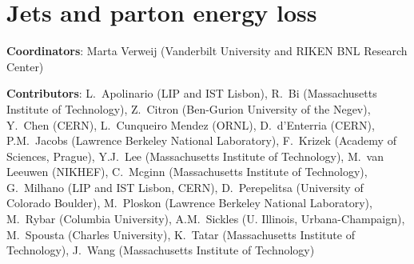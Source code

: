 \documentclass[../report.tex]{subfiles}
\providecommand{\main}{..}
\begin{document}
\section{Jets and parton energy loss}\label{sec:HI_Jets}

{ \small
  \noindent \textbf{Coordinators}: Marta Verweij (Vanderbilt University and RIKEN BNL Research Center)
  
  \noindent \textbf{Contributors}:
L.~Apolinario (LIP and IST Lisbon),
R.~Bi (Massachusetts Institute of Technology),
Z.~Citron (Ben-Gurion University of the Negev),
Y.~Chen (CERN),
L.~Cunqueiro Mendez (ORNL),
D.~d'Enterria (CERN),
P.M.~Jacobs (Lawrence Berkeley National Laboratory),
F.~Krizek (Academy of Sciences, Prague),
Y.J.~Lee (Massachusetts Institute of Technology),
M.~van Leeuwen (NIKHEF),
C.~Mcginn (Massachusetts Institute of Technology),
G.~Milhano (LIP and IST Lisbon, CERN),
D.~Perepelitsa (University of Colorado Boulder),
M.~Ploskon (Lawrence Berkeley National Laboratory),
M.~Rybar (Columbia University),
A.M.~Sickles (U. Illinois, Urbana-Champaign),
M.~Spousta (Charles University),
K.~Tatar (Massachusetts Institute of Technology),
J.~Wang (Massachusetts Institute of Technology)
}



\newpage

\newpage

\newpage

%
\end{document}
